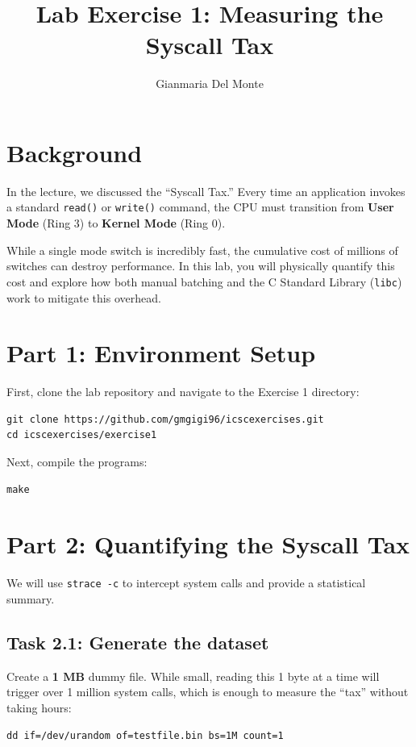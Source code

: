 \documentclass[11pt, a4paper]{article}
\title{\textbf{Lab Exercise 1: Measuring the Syscall Tax}}
\author{Gianmaria Del Monte}
\date{}
\begin{document}
\maketitle

\section*{Background}
In the lecture, we discussed the ``Syscall Tax.'' Every time an application invokes a standard \texttt{read()} or \texttt{write()} command, the CPU must transition from \textbf{User Mode} (Ring 3) to \textbf{Kernel Mode} (Ring 0). 

While a single mode switch is incredibly fast, the cumulative cost of millions of switches can destroy performance. In this lab, you will physically quantify this cost and explore how both manual batching and the C Standard Library (\texttt{libc}) work to mitigate this overhead.

\section*{Part 1: Environment Setup}
First, clone the lab repository and navigate to the Exercise 1 directory:

\begin{verbatim}
git clone https://github.com/gmgigi96/icscexercises.git
cd icscexercises/exercise1
\end{verbatim}

Next, compile the programs:
\begin{verbatim}
make
\end{verbatim}

\section*{Part 2: Quantifying the Syscall Tax}
We will use \texttt{strace -c} to intercept system calls and provide a statistical summary.

\subsection*{Task 2.1: Generate the dataset}
Create a \textbf{1 MB} dummy file. While small, reading this 1 byte at a time will trigger over 1 million system calls, which is enough to measure the ``tax'' without taking hours:

\begin{verbatim}
dd if=/dev/urandom of=testfile.bin bs=1M count=1
\end{verbatim}
\end{document}
